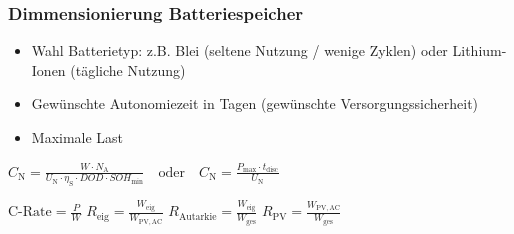 \subsubsection{Dimmensionierung Batteriespeicher}

\begin{itemize}
    \item Wahl Batterietyp: z.B. Blei (seltene Nutzung / wenige Zyklen) oder Lithium-Ionen (tägliche Nutzung)
    \item Gewünschte Autonomiezeit in Tagen (gewünschte Versorgungssicherheit)
    \item Maximale Last
\end{itemize}

\vspace{0.15cm}

$
\boxed{
C_{\mathrm{N}} = \frac{W \cdot N_{\mathrm{A}}}{U_{\mathrm{N}} \cdot \eta_{\mathrm{S}} \cdot DOD \cdot SOH_{\mathrm{min}}}
}
\quad \text{oder} \quad
\boxed{
C_{\mathrm{N}} = \frac{P_{\mathrm{max}} \cdot t_{\mathrm{disc}}}{U_{\mathrm{N}}}
}
$

$\boxed{\text{C-Rate} = \frac{P}{W}}$
\quad
$\boxed{R_{\mathrm{eig}} = \frac{W_{\mathrm{eig}}}{W_{\mathrm{PV,AC}}}}$
\quad
$\boxed{R_{\mathrm{Autarkie}} = \frac{W_{\mathrm{eig}}}{W_{\mathrm{ges}}}}$
\quad
$\boxed{R_{\mathrm{PV}} = \frac{W_{\mathrm{PV,AC}}}{W_{\mathrm{ges}}}}$


